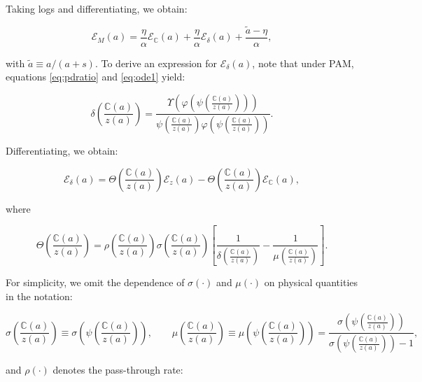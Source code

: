 Taking logs and differentiating, we obtain:

\begin{equation*}
	\mathcal{E}_{M}(a) = \frac{\eta}{\alpha} \mathcal{E}_{\mathbb{C}}(a) + \frac{\eta}{\alpha} \mathcal{E}_{\delta}(a) + \frac{\widetilde{a}-\eta}{\alpha},
\end{equation*}

with $\widetilde{a} \equiv a/(a+s)$. To derive an expression for $\mathcal{E}_\delta(a)$, note that under PAM, equations \eqref{eq:pdratio} and \eqref{eq:ode1} yield:

\begin{equation}\label{eq:deltaeq}
	\delta\left(\frac{\mathbb{C}(a)}{z(a)}\right) = \frac{\Upsilon\left(\varphi \left(\psi \left(\frac{{\mathbb{C}(a)}}{z(a)}\right)\right)\right)}{\psi\left(\frac{{\mathbb{C}(a)}}{z(a)}\right) \varphi\left(\psi\left(\frac{{\mathbb{C}(a)}}{z(a)}\right)\right)}.
\end{equation}

Differentiating, we obtain:

\begin{equation*}
	\mathcal{E}_{\delta}(a) = \Theta\left(\frac{\mathbb{C}(a)}{z(a)}\right)\mathcal{E}_z(a) - \Theta\left(\frac{\mathbb{C}(a)}{z(a)}\right)\mathcal{E}_\mathbb{C}(a), 
\end{equation*}

where

\begin{equation}\label{eq:superpt}
	\Theta\left(\frac{\mathbb{C}(a)}{z(a)}\right) = \rho \left(\frac{\mathbb{C}(a)}{z(a)}\right) \sigma\left(\frac{\mathbb{C}(a)}{z(a)}\right) \left[\frac{1}{\delta\left(\frac{\mathbb{C}(a)}{z(a)}\right)} - \frac{1}{\mu\left(\frac{\mathbb{C}(a)}{z(a)}\right)} \right].
\end{equation}

For simplicity, we omit the dependence of $\sigma(\cdot)$ and $\mu(\cdot)$ on physical quantities in the notation:

\begin{equation*}
	\sigma\left(\frac{\mathbb{C}(a)}{z(a)}\right) \equiv \sigma\left(\psi \left(\frac{\mathbb{C}(a)}{z(a)}\right) \right), \qquad \mu\left(\frac{\mathbb{C}(a)}{z(a)}\right) \equiv \mu\left(\psi \left(\frac{\mathbb{C}(a)}{z(a)}\right) \right) = \frac{\sigma\left(\psi \left(\frac{\mathbb{C}(a)}{z(a)}\right) \right)}{\sigma\left(\psi \left(\frac{\mathbb{C}(a)}{z(a)}\right) \right) - 1},
\end{equation*}

and $\rho(\cdot)$ denotes the pass-through rate:

